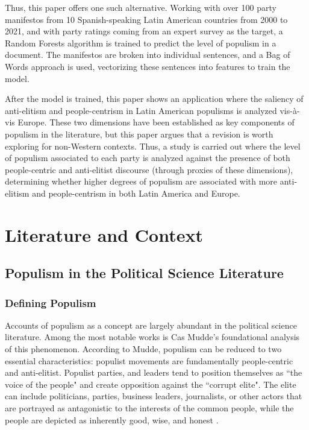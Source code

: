 \documentclass[12pt,letterpaper]{article}
\begin{document}
Thus, this paper offers one such alternative. Working with over 100 party manifestos from 10 Spanish-speaking Latin American countries from 2000 to 2021, and with party ratings coming from an expert survey as the target, a Random Forests algorithm is trained to predict the level of populism in a document. The manifestos are broken into individual sentences, and a Bag of Words approach is used, vectorizing these sentences into features to train the model. 

After the model is trained, this paper shows an application where the saliency of anti-elitism and people-centrism in Latin American populisms is analyzed vis-à-vis Europe. These two dimensions have been established as key components of populism in the literature, but this paper argues that a revision is worth exploring for non-Western contexts. Thus, a study is carried out where the level of populism associated to each party is analyzed against the presence of both people-centric and anti-elitist discourse (through proxies of these dimensions), determining whether higher degrees of populism are associated with more anti-elitism and people-centrism in both Latin America and Europe. 

\section{Literature and Context}

\vspace{.25cm}
\subsection{Populism in the Political Science Literature}

\vspace{.25cm}
\subsubsection{Defining Populism}

\vspace{.25cm}
\noindent Accounts of populism as a concept are largely abundant in the political science literature. Among the most notable works is Cas Mudde's foundational analysis of this phenomenon. According to Mudde, populism can be reduced to two essential characteristics: populist movements are fundamentally people-centric and anti-elitist. Populist parties, and leaders tend to position themselves as ``the voice of the people" and create opposition against the ``corrupt elite". The elite can include politicians, parties, business leaders, journalists, or other actors that are portrayed as antagonistic to the interests of the common people, while the people are depicted as inherently good, wise, and honest\autocite{muddePopulistZeitgeist2004} .
\end{document}
